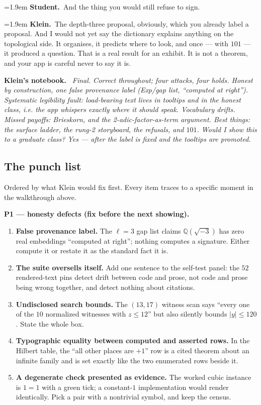 \documentclass[11pt]{article}
\newcommand{\Stu}[1]{\par\smallskip\noindent\hangindent=1.9em\hangafter=1%
  \textcolor{stucol}{\textbf{Student.}}~#1\par}
\newcommand{\Kle}[1]{\par\smallskip\noindent\hangindent=1.9em\hangafter=1%
  \textcolor{klecol}{\textbf{Klein.}}~#1\par}
\newenvironment{knote}%
  {\begin{snugshade}\small\noindent\textbf{\textcolor{klecol}{Klein's notebook.}}\itshape\ }%
  {\end{snugshade}}
\begin{document}
\Stu{And the thing you would still refuse to sign.}

\Kle{The depth-three proposal, obviously, which you already label a proposal. And I would not yet say the dictionary explains anything on the topological side. It organises, it predicts where to look, and once --- with $101$ --- it produced a question. That is a real result for an exhibit. It is not a theorem, and your app is careful never to say it is.}

\begin{knote}
Final. Correct throughout; four attacks, four holds. Honest by construction, one false provenance label (Exp/gap list, ``computed at right''). Systematic legibility fault: load-bearing text lives in tooltips and in the honest class, i.e. the app whispers exactly where it should speak. Vocabulary drifts. Missed payoffs: Brieskorn, and the 2-adic-factor-as-term argument. Best things: the surface ladder, the rung-2 storyboard, the refusals, and $101$. Would I show this to a graduate class? Yes --- after the label is fixed and the tooltips are promoted.
\end{knote}

\subsection*{The punch list}

Ordered by what Klein would fix first. Every item traces to a specific moment in the walkthrough above.

\textbf{P1 --- honesty defects (fix before the next showing).}
\begin{enumerate}[leftmargin=1.4em,itemsep=2pt]
\item \textbf{False provenance label.} The $\ell = 3$ gap list claims $\mathbb{Q}(\sqrt{-3})$ has zero real embeddings ``computed at right''; nothing computes a signature. Either compute it or restate it as the standard fact it is.
\item \textbf{The suite oversells itself.} Add one sentence to the self-test panel: the $52$ rendered-text pins detect drift between code and prose, not code and prose being wrong together, and detect nothing about citations.
\item \textbf{Undisclosed search bounds.} The $(13,17)$ witness scan says ``every one of the $10$ normalized witnesses with $z \le 12$'' but also silently bounds $|y| \le 120$. State the whole box.
\item \textbf{Typographic equality between computed and asserted rows.} In the Hilbert table, the ``all other places are $+1$'' row is a cited theorem about an infinite family and is set exactly like the two enumerated rows beside it.
\item \textbf{A degenerate check presented as evidence.} The worked cubic instance is $1 = 1$ with a green tick; a constant-$1$ implementation would render identically. Pick a pair with a nontrivial symbol, and keep the census.
\end{enumerate}
\end{document}
